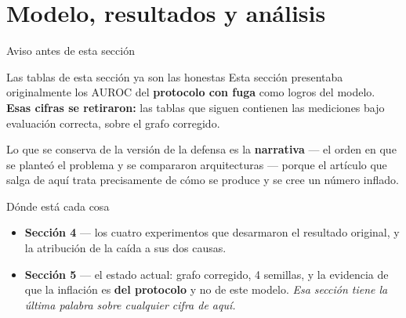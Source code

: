 \section{Modelo, resultados y an\'alisis}

\begin{frame}{Aviso antes de esta secci\'on}
  \vspace{0.6em}
  \begin{block}{Las tablas de esta secci\'on ya son las honestas}
    \small
    Esta secci\'on presentaba originalmente los AUROC del \textbf{protocolo con fuga} como
    logros del modelo. \textbf{Esas cifras se retiraron:} las tablas que siguen contienen
    las mediciones bajo evaluaci\'on correcta, sobre el grafo corregido.

    \vspace{0.4em}
    Lo que se conserva de la versi\'on de la defensa es la \textbf{narrativa} --- el orden
    en que se plante\'o el problema y se compararon arquitecturas --- porque el art\'iculo
    que salga de aqu\'i trata precisamente de c\'omo se produce y se cree un n\'umero
    inflado.
  \end{block}

  \vspace{0.3em}
  \begin{block}{D\'onde est\'a cada cosa}
    \scriptsize
    \begin{itemize}
      \item \textbf{Secci\'on 4} --- los cuatro experimentos que desarmaron el resultado
            original, y la atribuci\'on de la ca\'ida a sus dos causas.
      \item \textbf{Secci\'on 5} --- el estado actual: grafo corregido, 4 semillas, y la
            evidencia de que la inflaci\'on es \textbf{del protocolo} y no de este modelo.
            \emph{Esa secci\'on tiene la \'ultima palabra sobre cualquier cifra de aqu\'i.}
    \end{itemize}
  \end{block}
\end{frame}

